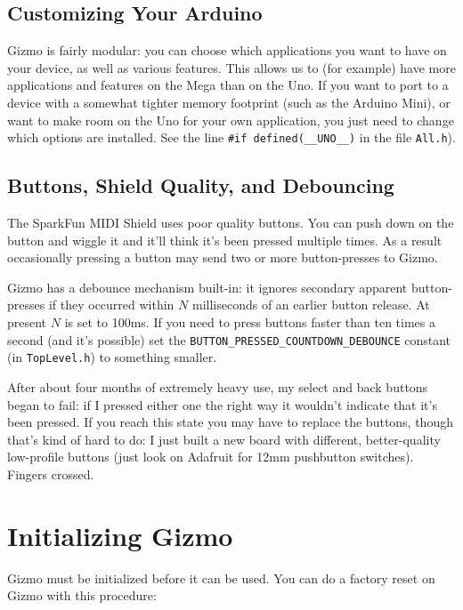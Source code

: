 \documentclass{article}
\begin{document}
\subsection{Customizing Your Arduino}

Gizmo is fairly modular: you can choose which applications you want to have on your device, as well as various features.  This allows us to (for example) have more applications and features on the Mega than on the Uno.  If you want to port to a device with a somewhat tighter memory footprint (such as the Arduino Mini), or want to make room on the Uno for your own application, you just need to change which options are installed.  See the line {\tt \#if defined(\_\_UNO\_\_)} in the file \texttt{All.h}).

\subsection{Buttons, Shield Quality, and Debouncing}
\label{debouncing}

The SparkFun MIDI Shield uses poor quality buttons.  You can push down on the button and wiggle it and it'll think it's been pressed multiple times.  As a result occasionally pressing a button may send two or more button-presses to Gizmo.

Gizmo has a debounce mechanism built-in: it ignores secondary apparent button-presses if they occurred within \(N\) milliseconds of an earlier button release.  At present \(N\) is set to 100ms.  If you need to press buttons faster than ten times a second (and it's possible) set the \texttt{BUTTON\_PRESSED\_COUNTDOWN\_DEBOUNCE} constant (in \texttt{TopLevel.h}) to something smaller.

After about four months of extremely heavy use, my select and back buttons began to fail: if I pressed either one the right way it wouldn't indicate that it's been pressed.  If you reach this state you may have to replace the buttons, though that's kind of hard to do: I just built a new board with different, better-quality low-profile buttons (just look on Adafruit for 12mm pushbutton switches).  Fingers crossed.

\clearpage
\section{Initializing Gizmo}

Gizmo must be initialized before it can be used.  You can do a factory reset on Gizmo with this procedure:
\end{document}
